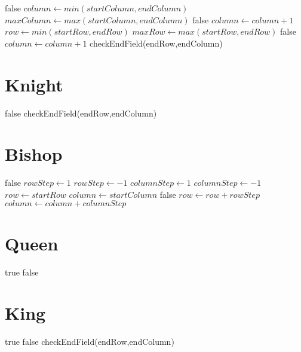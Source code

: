\begin{algorithmic}
    \State \Return false
\EndIf
{}
    \State $column\gets min(startColumn,endColumn)$
    \State $maxColumn\gets max(startColumn,endColumn)$
   		 \State \Return false
   	 \EndIf
   	 \State $column\gets column + 1$
    \EndWhile
\Else
	\State $row\gets min(startRow,endRow)$
    \State $maxRow\gets max(startRow,endRow)$
   		 \State \Return false
   	 \EndIf
   	 \State $column\gets column + 1$
    \EndWhile
\EndIf
\State \Return checkEndField(endRow,endColumn)
\end{algorithmic}


\section{Knight}

\begin{algorithmic}
    \State \Return false
\EndIf
\State \Return checkEndField(endRow,endColumn)
\end{algorithmic}

\section{Bishop}

\begin{algorithmic}
    \State \Return false
\EndIf
{}
    \State $rowStep\gets 1$
\Else
	\State $rowStep\gets -1$
\EndIf
{}
    \State $columnStep\gets 1$
\Else
	\State $columnStep\gets -1$
\EndIf
\State $row\gets startRow$
\State $column\gets startColumn$
   		 \State \Return false
   	 \EndIf
   	 \State $row\gets row +rowStep$
   	 \State $column\gets column + columnStep$
    \EndWhile
\end{algorithmic}

\section{Queen}

\begin{algorithmic}
    \State \Return true
\EndIf
 \State \Return false
\end{algorithmic}

\section{King}

\begin{algorithmic}
    \State \Return true
\EndIf
\State \Return false
\State \Return checkEndField(endRow,endColumn)
\end{algorithmic}




